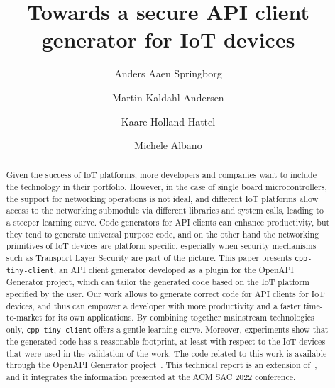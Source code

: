\documentclass[manuscript,screen]{acmart}
\begin{document}
\sloppy %
\title{Towards a secure API client generator for IoT devices}



\author{Anders Aaen Springborg}
\author{Martin Kaldahl Andersen}
\author{Kaare Holland Hattel}
\author{Michele Albano}





\begin{abstract}
Given the success of IoT platforms, more developers and companies want to include the technology in their portfolio. However, in the case of single board microcontrollers, the support for networking operations is not ideal, and different IoT platforms allow access to the networking submodule via different libraries and system calls, leading to a steeper learning curve. 
Code generators for API clients can enhance productivity, but they tend to generate universal purpose code, and on the other hand the networking primitives of IoT devices are platform specific, especially when security mechanisms such as Transport Layer Security are part of the picture. 
%
This paper presents \texttt{cpp-tiny-client}, an API client generator developed as a plugin for the OpenAPI Generator project, which can tailor the generated code based on the IoT platform specified by the user. Our work allows to generate correct code for API clients for IoT devices, and thus can empower a developer with more productivity and a faster time-to-market for its own applications. 
By combining together mainstream technologies only, \texttt{cpp-tiny-client} offers a gentle learning curve. Moreover, experiments show that the generated code has a reasonable footprint, at least with respect to the IoT devices that were used in the validation of the work. 
The code related to this work is available through the OpenAPI Generator project~\cite{OpenAPIGenerator}. 
This technical report is an extension of~\cite{acmsac22}, and it integrates the information presented at the ACM SAC 2022 conference. 
\end{abstract}
\end{document}
